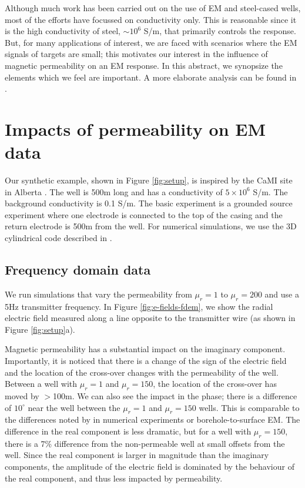 Although much work has been carried out on the use of EM and steel-cased wells, most of the efforts have focussed on conductivity only. This is reasonable since it is the high conductivity of steel, $\sim 10^6$ S/m, that primarily controls the response. But, for many applications of interest, we are faced with scenarios where the EM signals of targets are small; this motivates our interest in the influence of magnetic permeability on an EM response. In this abstract, we synopsize the elements which we feel are important. A more elaborate analysis can be found in \cite{heagy_impacts_2023, heagy_electromagnetic_2018}.


\section{Impacts of permeability on EM data}

Our synthetic example, shown in Figure \ref{fig:setup}, is inspired by the CaMI site in Alberta \citep{wilt_casing_2020, beskardes_effects_2021}. The well is 500m long and has a conductivity of $5\times10^6$ S/m. The background conductivity is 0.1 S/m. The basic experiment is a grounded source experiment where one electrode is connected to the top of the casing and the return electrode is 500m from the well. For numerical simulations, we use the 3D cylindrical code described in \citep{heagy_modeling_2019}.



\subsection{Frequency domain data}
We run simulations that vary the permeability from $\mu_r=1$ to $\mu_r=200$ and use a 5Hz transmitter frequency. In Figure \ref{fig:e-fields-fdem}, we show the radial electric field measured along a line opposite to the transmitter wire (as shown in Figure \ref{fig:setup}a).



Magnetic permeability has a substantial impact on the imaginary component. Importantly, it is noticed that there is a change of the sign of the electric field and the location of the cross-over changes with the permeability of the well. Between a well with $\mu_r=1$ and $\mu_r=150$, the location of the cross-over has moved by $>$100m. We can also see the impact in the phase; there is a difference of $10^{\circ}$ near the well between the $\mu_r=1$  and $\mu_r=150$ wells. This is comparable to the differences noted by \cite{cuevas_effect_2018} in numerical experiments or borehole-to-surface EM. The difference in the real component is less dramatic, but for a well with $\mu_r=150$, there is a 7\% difference from the non-permeable well at small offsets from the well. Since the real component is larger in magnitude than the imaginary components, the amplitude of the electric field is dominated by the behaviour of the real component, and thus less impacted by permeability.

